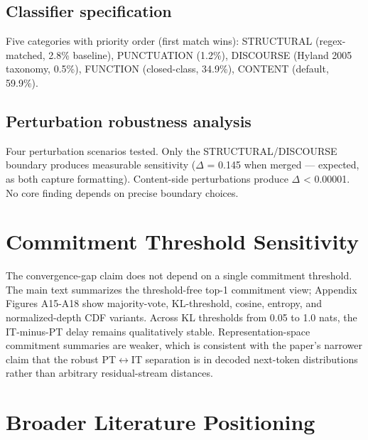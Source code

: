 \documentclass[11pt]{article}
\begin{document}
\subsection{Classifier specification}

Five categories with priority order (first match wins): STRUCTURAL (regex-matched, 2.8\% baseline), PUNCTUATION (1.2\%), DISCOURSE (Hyland 2005 taxonomy, 0.5\%), FUNCTION (closed-class, 34.9\%), CONTENT (default, 59.9\%).

\subsection{Perturbation robustness analysis}

Four perturbation scenarios tested. Only the STRUCTURAL/DISCOURSE boundary produces measurable sensitivity (\ensuremath{\Delta} = 0.145 when merged --- expected, as both capture formatting). Content-side perturbations produce \ensuremath{\Delta} < 0.00001. No core finding depends on precise boundary choices.

\section{Commitment Threshold Sensitivity}

The convergence-gap claim does not depend on a single commitment threshold. The main text summarizes the threshold-free top-1 commitment view; Appendix Figures A15-A18 show majority-vote, KL-threshold, cosine, entropy, and normalized-depth CDF variants. Across KL thresholds from 0.05 to 1.0 nats, the IT-minus-PT delay remains qualitatively stable. Representation-space commitment summaries are weaker, which is consistent with the paper's narrower claim that the robust PT\ensuremath{\leftrightarrow}IT separation is in decoded next-token distributions rather than arbitrary residual-stream distances.

\section{Broader Literature Positioning}
\end{document}
